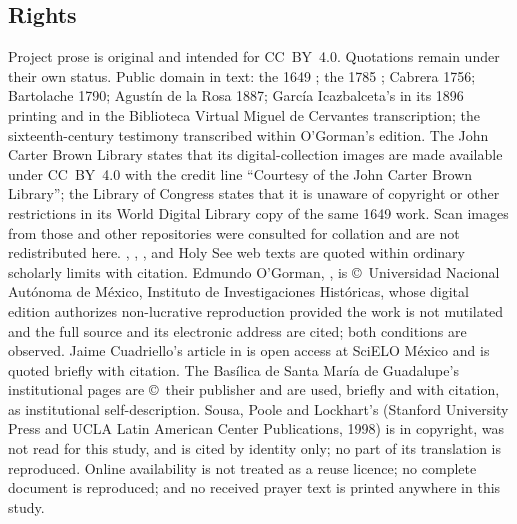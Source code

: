 \subsection*{Rights}

Project prose is original and intended for CC~BY~4.0. Quotations remain
under their own status. Public domain in text: the 1649
; the 1785 ; Cabrera 1756; Bartolache 1790; Agust\'in de la Rosa 1887;
Garc\'ia Icazbalceta's  in its 1896 printing and in the
Biblioteca Virtual Miguel de Cervantes transcription; the
sixteenth-century testimony transcribed within O'Gorman's edition. The
John Carter Brown Library states that its digital-collection images are
made available under CC~BY~4.0 with the credit line ``Courtesy of the
John Carter Brown Library''; the Library of Congress states that it is
unaware of copyright or other restrictions in its World Digital Library
copy of the same 1649 work. Scan images from those and other
repositories were consulted for collation and are not redistributed
here. , ,
, and Holy See web texts are quoted within ordinary
scholarly limits with citation. Edmundo O'Gorman, , is \copyright\ Universidad Nacional Aut\'onoma de M\'exico,
Instituto de Investigaciones Hist\'oricas, whose digital edition
authorizes non-lucrative reproduction provided the work is not mutilated
and the full source and its electronic address are cited; both
conditions are observed. Jaime Cuadriello's article in  is open access at SciELO
M\'exico and is quoted briefly with citation. The Bas\'ilica de Santa
Mar\'ia de Guadalupe's institutional pages are \copyright\ their
publisher and are used, briefly and with citation, as institutional
self-description. Sousa, Poole and Lockhart's  (Stanford University Press and UCLA Latin American Center
Publications, 1998) is in copyright, was not read for this study, and
is cited by identity only; no part of its translation is reproduced.
Online availability is not treated as a reuse licence; no complete
document is reproduced; and no received prayer text is printed anywhere
in this study.
